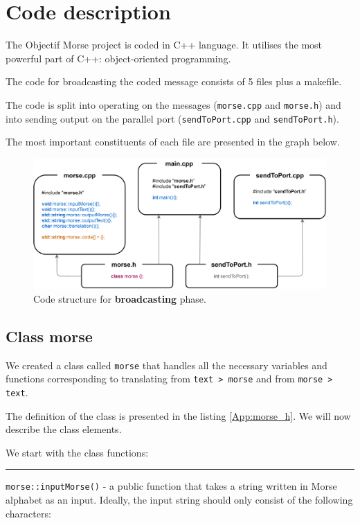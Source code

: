 \documentclass[12pt]{report}
\begin{document}
\section{Code description}

The Objectif Morse project is coded in C++ language. It utilises the most powerful part of C++: object-oriented programming.

The code for broadcasting the coded message consists of 5 files plus a makefile. 

The code is split into operating on the messages (\verb|morse.cpp| and \verb|morse.h|) and into sending output on the parallel port (\verb|sendToPort.cpp| and \verb|sendToPort.h|).

The most important constituents of each file are presented in the graph below.

\begin{figure}[H]
\centering\includegraphics[scale=0.12]{broadcast_code}
\caption{Code structure for \textbf{broadcasting} phase.}				
\label{fig:br_code}
\end{figure}




\subsection{Class morse}

We created a class called \verb|morse| that handles all the necessary variables and functions corresponding to translating from \verb|text > morse| and from \verb|morse > text|.

The definition of the class is presented in the listing \ref{App:morse_h}. We will now describe the class elements.

We start with the class functions:

\rule{\textwidth}{0.5pt}

\verb|morse::inputMorse()| - a public function that takes a string written in Morse alphabet as an input. Ideally, the input string should only consist of the following characters:
\end{document}

